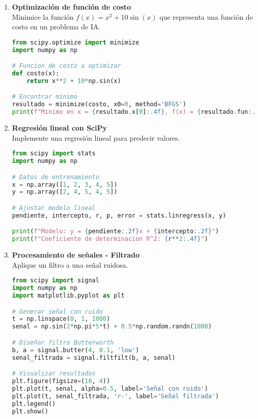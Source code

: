 \documentclass[12pt,a4paper]{article}
\begin{document}
\begin{enumerate}[label=\textbf{Ejercicio \arabic*:}, leftmargin=1.5cm]

\item \textbf{Optimización de función de costo} \\
Minimice la función $f(x) = x^2 + 10 \sin(x)$ que representa una función de costo en un problema de IA.

\begin{lstlisting}[language=Python]
from scipy.optimize import minimize
import numpy as np

# Funcion de costo a optimizar
def costo(x):
    return x**2 + 10*np.sin(x)

# Encontrar minimo
resultado = minimize(costo, x0=0, method='BFGS')
print(f"Minimo en x = {resultado.x[0]:.4f}, f(x) = {resultado.fun:.4f}")
\end{lstlisting}

\item \textbf{Regresión lineal con SciPy} \\
Implemente una regresión lineal para predecir valores.

\begin{lstlisting}[language=Python]
from scipy import stats
import numpy as np

# Datos de entrenamiento
x = np.array([1, 2, 3, 4, 5])
y = np.array([2, 4, 5, 4, 5])

# Ajustar modelo lineal
pendiente, intercepto, r, p, error = stats.linregress(x, y)

print(f"Modelo: y = {pendiente:.2f}x + {intercepto:.2f}")
print(f"Coeficiente de determinacion R^2: {r**2:.4f}")
\end{lstlisting}

\item \textbf{Procesamiento de señales - Filtrado} \\
Aplique un filtro a una señal ruidosa.

\begin{lstlisting}[language=Python]
from scipy import signal
import numpy as np
import matplotlib.pyplot as plt

# Generar señal con ruido
t = np.linspace(0, 1, 1000)
senal = np.sin(2*np.pi*5*t) + 0.5*np.random.randn(1000)

# Diseñar filtro Butterworth
b, a = signal.butter(4, 0.1, 'low')
senal_filtrada = signal.filtfilt(b, a, senal)

# Visualizar resultados
plt.figure(figsize=(10, 4))
plt.plot(t, senal, alpha=0.5, label='Señal con ruido')
plt.plot(t, senal_filtrada, 'r-', label='Señal filtrada')
plt.legend()
plt.show()
\end{lstlisting}


\end{enumerate}
\end{document}
